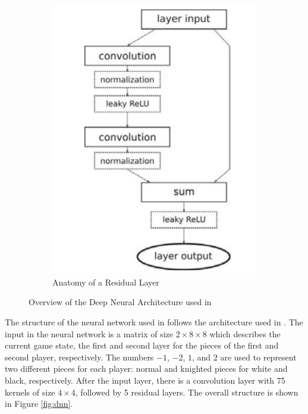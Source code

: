\begin{figure}[htb]
\begin{subfigure}{0.4\textwidth}
        \includegraphics[scale=0.25]{images/residual_layer.png}
        \caption{Anatomy of a Residual Layer}
        \label{fig:residual}
    \end{subfigure}
    \caption{Overview of the Deep Neural Architecture used in \cite{Popic_Boskovic_Brest_2021}}
    \label{fig:popic-nn}
\end{figure}


The structure of the neural network used in \cite{Popic_Boskovic_Brest_2021} follows the architecture used in \cite{silver2017masteringchessshogiselfplay}. The input in the neural network is a matrix of size $2 \times 8 \times 8$ which describes the current game state, the first and second layer for the pieces of the first and second player, respectively. The numbers $-1$, $-2$, $1$, and $2$ are used to represent two different pieces for each player: normal and knighted pieces for white and black, respectively. After the input layer, there is a convolution layer with 75 kernels of size $4 \times 4$, followed by 5 residual layers. The overall structure is shown in Figure \ref{fig:dnn}.

